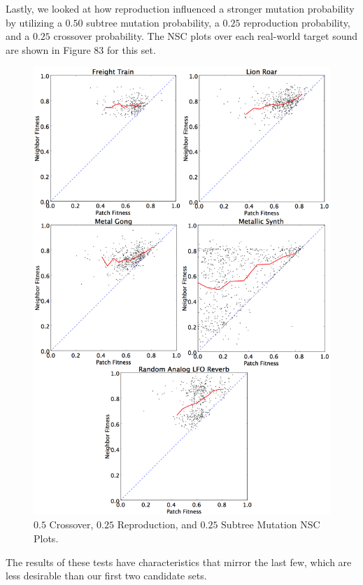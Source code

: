 \documentclass[12pt]{report} 	%
\numberwithin{figure}{chapter}
\numberwithin{table}{chapter}
\numberwithin{equation}{chapter}
\begin{document}
\begin{flushleft}
Lastly, we looked at how reproduction influenced a stronger mutation probability by utilizing a $0.50$ subtree mutation probability, a $0.25$ reproduction probability, and a $0.25$ crossover probability. The NSC plots over each real-world target sound are shown in Figure 83 for this set.
\begin{figure}[h!]
\begin{center}
\includegraphics[scale=0.15]{GOPS_Param7}
\caption[$0.25$ Crossover, $0.25$ reproduction, and $0.5$ subtree mutation NSC plots]{$0.5$ Crossover, $0.25$ Reproduction, and $0.25$ Subtree Mutation NSC Plots.}
\end{center}
\end{figure}

The results of these tests have characteristics that mirror the last few, which are less desirable than our first two candidate sets. 


\end{flushleft}
\end{document}
